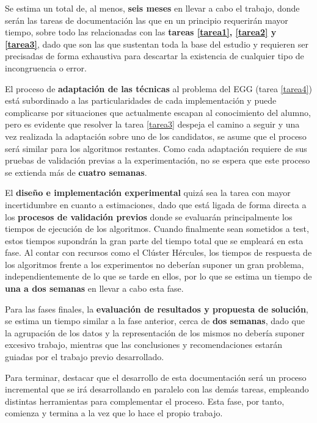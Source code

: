 Se estima un total de, al menos, \textbf{seis meses} en llevar a cabo el trabajo, donde serán las tareas de documentación las que en un principio requerirán mayor tiempo, sobre todo las relacionadas con las \textbf{tareas \ref{tarea1}, \ref{tarea2} y \ref{tarea3}}, dado que son las que sustentan toda la base del estudio y requieren ser precisadas de forma exhaustiva para descartar la existencia de cualquier tipo de incongruencia o error.

El proceso de \textbf{adaptación de las técnicas} al problema del EGG (tarea \ref{tarea4}) está subordinado a las particularidades de cada implementación y puede complicarse por situaciones que actualmente escapan al conocimiento del alumno, pero es evidente que resolver la tarea \ref{tarea3} despeja el camino a seguir y una vez realizada la adaptación sobre uno de los candidatos, se asume que el proceso será similar para los algoritmos restantes. Como cada adaptación requiere de sus pruebas de validación previas a la experimentación, no se espera que este proceso se extienda más de \textbf{cuatro semanas}. 

El \textbf{diseño e implementación experimental} quizá sea la tarea con mayor incertidumbre en cuanto a estimaciones, dado que está ligada de forma directa a los \textbf{procesos de validación previos} donde se evaluarán principalmente los tiempos de ejecución de los algoritmos. Cuando finalmente sean sometidos a test, estos tiempos supondrán la gran parte del tiempo total que se empleará en esta fase. Al contar con recursos como el Clúster Hércules, los tiempos de respuesta de los algoritmos frente a los experimentos no deberían suponer un gran problema, independientemente de lo que se tarde en ellos, por lo que se estima un tiempo de \textbf{una a dos semanas} en llevar a cabo esta fase.

Para las fases finales, la \textbf{evaluación de resultados y propuesta de solución}, se estima un tiempo similar a la fase anterior, cerca de \textbf{dos semanas}, dado que la agrupación de los datos y la representación de los mismos no debería suponer excesivo trabajo, mientras que las conclusiones y recomendaciones estarán guiadas por el trabajo previo desarrollado.

Para terminar, destacar que el desarrollo de esta documentación será un proceso incremental que se irá desarrollando en paralelo con las demás tareas, empleando distintas herramientas para complementar el proceso. Esta fase, por tanto, comienza y termina a la vez que lo hace el propio trabajo.


